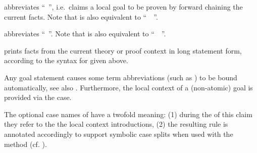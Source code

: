 \begin{isabellebody}
\begin{isamarkuptext}
\begin{descr}
  \item [\mbox{\isa{\isacommand{hence}}}] abbreviates ``\mbox{}~\mbox{}'', i.e.\ claims a local goal to be proven by forward
  chaining the current facts.  Note that \mbox{} is also
  equivalent to ``\mbox{}~~\mbox{}''.
  
  \item [\mbox{\isa{\isacommand{thus}}}] abbreviates ``\mbox{}~\mbox{}''.  Note that \mbox{} is also equivalent to
  ``\mbox{}~~\mbox{}''.
  
  \item [\mbox{\isa{\isacommand{print{\isacharunderscore}statement}}}~\isa{a}] prints facts from the
  current theory or proof context in long statement form, according to
  the syntax for \mbox{} given above.

  \end{descr}

  Any goal statement causes some term abbreviations (such as
  \mbox{}) to be bound automatically, see also
  .  Furthermore, the local context of a
  (non-atomic) goal is provided via the \mbox{} case.

  The optional case names of \mbox{} have a twofold
  meaning: (1) during the of this claim they refer to the the local
  context introductions, (2) the resulting rule is annotated
  accordingly to support symbolic case splits when used with the
  \mbox{} method (cf.  ).

  \medskip


\end{isamarkuptext}
\end{isabellebody}
